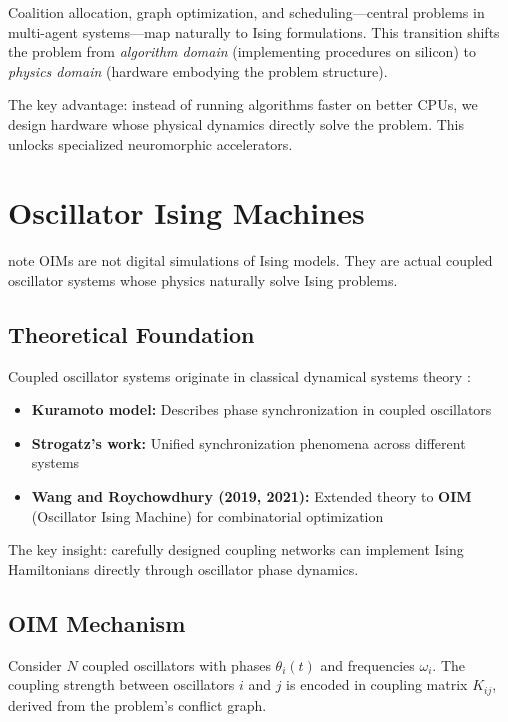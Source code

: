 Coalition allocation, graph optimization, and scheduling---central problems in multi-agent systems---map naturally to Ising formulations. This transition shifts the problem from \textit{algorithm domain} (implementing procedures on silicon) to \textit{physics domain} (hardware embodying the problem structure).

The key advantage: instead of running algorithms faster on better CPUs, we design hardware whose physical dynamics directly solve the problem. This unlocks specialized neuromorphic accelerators.

\section{Oscillator Ising Machines}
\begin{block}{note}
OIMs are not digital simulations of Ising models. They are actual coupled oscillator systems whose physics naturally solve Ising problems.
\end{block}


\subsection{Theoretical Foundation}

Coupled oscillator systems originate in classical dynamical systems theory \cite{Kuramoto1984, Strogatz2000}:
\begin{itemize}
\item \textbf{Kuramoto model:} Describes phase synchronization in coupled oscillators
\item \textbf{Strogatz's work:} Unified synchronization phenomena across different systems
\item \textbf{Wang and Roychowdhury (2019, 2021):} Extended theory to \textbf{OIM} (Oscillator Ising Machine) for combinatorial optimization
\end{itemize}

The key insight: carefully designed coupling networks can implement Ising Hamiltonians directly through oscillator phase dynamics.

\subsection{OIM Mechanism}

Consider $N$ coupled oscillators with phases $\theta_i(t)$ and frequencies $\omega_i$. The coupling strength between oscillators $i$ and $j$ is encoded in coupling matrix $K_{ij}$, derived from the problem's conflict graph.

